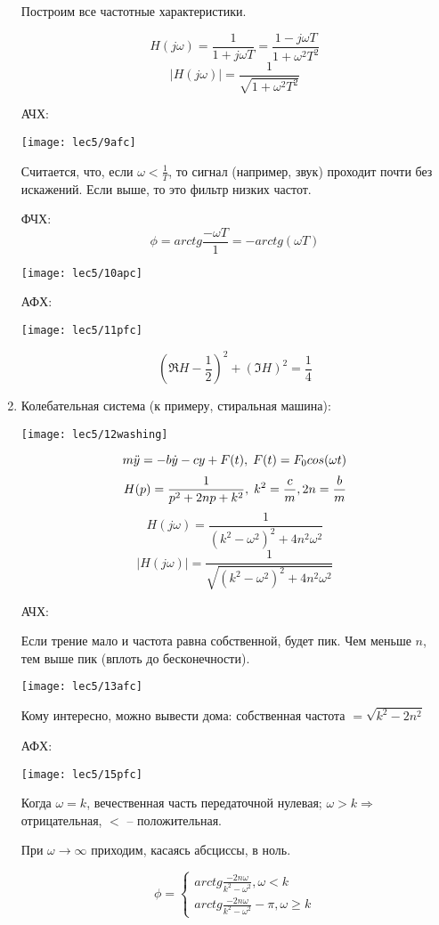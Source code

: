 \documentclass[main.tex]{subfiles}
\begin{document}
\begin{enumerate}[noitemsep]
	Построим все частотные характеристики.

	$$ H(j\omega) = \frac{1}{1 + j \omega T} = \frac{1 - j \omega T}{1 + \omega^2 T^2} $$
	$$ |H(j \omega)| = \frac{1}{\sqrt{1 + \omega^2 T^2}} $$

	АЧХ:

	\texttt{[image: lec5/9afc]}

	Считается, что, если $ \omega < \frac{1}{T} $, то сигнал (например, звук) проходит почти без искажений.
	Если выше, то это фильтр низких частот.

	ФЧХ:
	$$ \phi = arctg \frac{- \omega T}{1} = -arctg(\omega T) $$

	\texttt{[image: lec5/10apc]}

	АФХ:

	\texttt{[image: lec5/11pfc]}

	$$ \left(\Re H - \frac{1}{2}\right)^2 + (\Im H)^2 = \frac{1}{4} $$

\item Колебательная система (к примеру, стиральная машина):

\texttt{[image: lec5/12washing]}

$$ m \ddot y = -b \dot y - c y + F(t), \thickspace F(t) = F_0 cos(\omega t) $$
$$ H(p) = \frac{1}{p^2 + 2np + k^2}, \thickspace k^2 = \frac{c}{m}, 2n = \frac{b}{m} $$
$$ H(j \omega) = \frac{1}{(k^2 - \omega^2)^2 + 4 n^2 \omega^2} $$
$$ |H(j \omega)| = \frac{1}{\sqrt{(k^2-\omega^2)^2 + 4 n^2 \omega^2}} $$

АЧХ:

Если трение мало и частота равна собственной, будет пик.
Чем меньше $ n $, тем выше пик (вплоть до бесконечности).

\texttt{[image: lec5/13afc]}

Кому интересно, можно вывести дома: собственная частота $ = \sqrt{k^2 - 2n^2} $

АФХ:

\texttt{[image: lec5/15pfc]}

Когда $ \omega = k $, вечественная часть передаточной нулевая; $ \omega > k \Rightarrow $ отрицательная, $ < $ -- положительная.

При $ \omega \to \infty $ приходим, касаясь абсциссы, в ноль.

$$ \phi = \begin{cases}
arctg \frac{- 2n \omega}{k^2 - \omega^2}, \omega < k \\
arctg \frac{- 2n \omega}{k^2 - \omega^2} - \pi, \omega \ge k
\end{cases} $$


\end{enumerate}
\end{document}
